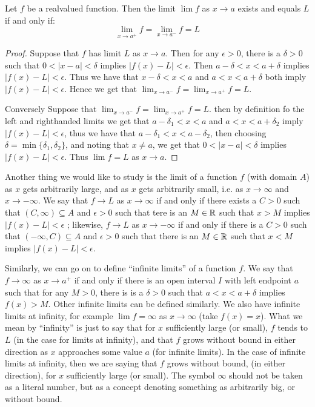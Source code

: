 \begin{theorem}\label{3.2.1}
    Let $f$ be a realvalued function. Then the limit $\lim{f}$ as  $x \rightarrow a$ 
    exists and equals  $L$ if and only if:
        \begin{equation*}
            \lim_{x \rightarrow a^+}{f}=\lim_{x \rightarrow a^-}{f}=L
        \end{equation*}
\end{theorem}
\begin{proof}
    Suppose that $f$ has limit  $L$ as  $x \rightarrow a$. Then for any  $\epsilon>0$, 
    there is a $\delta>0$ such that  $0<|x-a|<\delta$ implies  $|f(x)-L|<\epsilon$. 
    Then $a-\delta<x<a+\delta$ implies $|f(x)-L|<\epsilon$. Thus we have that 
    $x-\delta<x<a$ and  $a<x<a+\delta$ both imply  $|f(x)-L|<\epsilon$. Hence 
    we get that  $\lim_{x \rightarrow a^-}{f}=\lim_{x \rightarrow a^+}{f}=L$.

    Conversely Suppose that  $\lim_{x \rightarrow a^-}{f}=\lim_{x \rightarrow a^+}{f}=L$. 
    then by definition fo the left and righthanded limits we get that $a-\delta_1<x<a$ and 
    $a<x<a+\delta_2$ imply  $|f(x)-L|<\epsilon$, thus we have that $a-\delta_1<x<a-\delta_2$, 
    then choosing $\delta=\min\{\delta_1,\delta_2\}$, and noting that $x \neq a$, 
    we get that  $0<|x-a|<\delta$ implies  $|f(x)-L|<\epsilon$. Thus $\lim{f}=L$ 
    as  $x \rightarrow a$.
\end{proof}

Another thing we would like to study is the limit of a function $f$ (with domain $A$) 
as  $x$ gets arbitrarily large, and as  $x$ gets arbitrarily small, i.e. as 
$x \rightarrow \infty$ and  $x \rightarrow -\infty$. We say that $f \rightarrow L$ 
as  $x \rightarrow \infty$ if and only if there  exists a $C>0$ such that 
$(C,\infty) \subseteq A$ and $\epsilon>0$ such that tere is an $M \in \mathbb{R}$ 
such that  $x>M$ implies  $|f(x)-L|<\epsilon$ ; likewise, $f \rightarrow L$ as  $x \rightarrow -\infty$ if and only if 
there is a  $C>0$ such that  $(-\infty,C) \subseteq A$ and $\epsilon>0$ such that 
there is an $M \in \mathbb{R}$ such that $x<M$ implies  $|f(x)-L|<\epsilon$. 

Similarly, we 
can go on to define ``infinite limits'' of a function $f$. We say that $f \rightarrow \infty$ as 
$x \rightarrow a^+$ if and only if there is an open interval $I$ with left endpoint  $a$ 
such that for any  $M>0$, there is is a $\delta>0$ such that  $a<x<a+\delta$ implies 
$f(x)>M$. Other infinite limits can be defined similarly. We also have infinite limits 
at infinity, for example $\lim{f}=\infty$ as  $x \rightarrow \infty$ (take $f(x)=x$). 
What we mean by ``infinity'' is just to say that for  $x$ sufficiently large  (or small), 
$f$ tends to  $L$  (in the case for limits at infinity), and that $f$ grows without bound 
in either direction as  $x$ approaches some value  $a$  (for infinite limits). In 
the case of infinite limits at infinity, then we are saying that $f$ grows without bound, 
(in either direction), for $x$ sufficiently large (or small). The symbol $\infty$ 
should not be taken as a literal number, but as a concept denoting something as 
arbitrarily big, or without bound.

